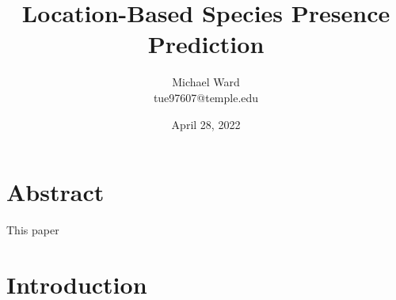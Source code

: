 \documentclass[12pt, oneside]{article}
\begin{document}
\title{Location-Based Species Presence Prediction}
\author{Michael Ward \\ tue97607@temple.edu}
\date{April 28, 2022}
\maketitle
\thispagestyle{empty}

\newpage
{}
\tableofcontents
\newpage
{}

\section{Abstract}
\label{Abstract}

\begin{normalsize}

This paper 

\end{normalsize}
\newpage

\section{Introduction}
\label{Introduction}
\end{document}

